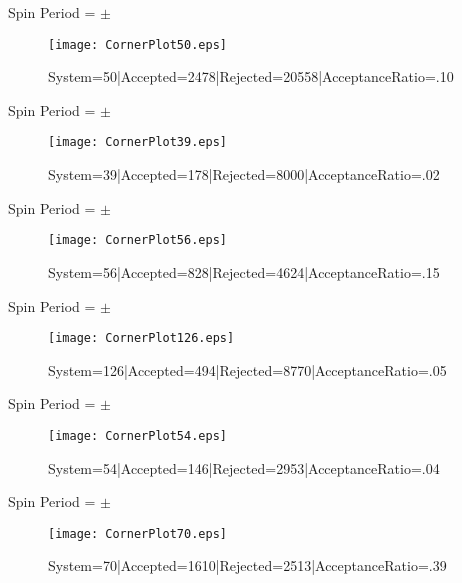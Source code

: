 \documentclass[10pt]{article}
\begin{document}
\begin{center}
        Spin Period = $\pm$ 
\begin{figure}[h] 
        \texttt{[image: CornerPlot50.eps]}
        \caption{System=50|Accepted=2478|Rejected=20558|AcceptanceRatio=.10}
        \label{S50}
        \centering
        \end{figure}
        \end{center}
\begin{center}
        Spin Period = $\pm$ 
\begin{figure}[h] 
        \texttt{[image: CornerPlot39.eps]}
        \caption{System=39|Accepted=178|Rejected=8000|AcceptanceRatio=.02}
        \label{S39}
        \centering
        \end{figure}
        \end{center}
\begin{center}
        Spin Period = $\pm$ 
\begin{figure}[h] 
        \texttt{[image: CornerPlot56.eps]}
        \caption{System=56|Accepted=828|Rejected=4624|AcceptanceRatio=.15}
        \label{S56}
        \centering
        \end{figure}
        \end{center}
\begin{center}
        Spin Period = $\pm$ 
\begin{figure}[h] 
        \texttt{[image: CornerPlot126.eps]}
        \caption{System=126|Accepted=494|Rejected=8770|AcceptanceRatio=.05}
        \label{S126}
        \centering
        \end{figure}
        \end{center}
\begin{center}
        Spin Period = $\pm$ 
\begin{figure}[h] 
        \texttt{[image: CornerPlot54.eps]}
        \caption{System=54|Accepted=146|Rejected=2953|AcceptanceRatio=.04}
        \label{S54}
        \centering
        \end{figure}
        \end{center}
\begin{center}
        Spin Period = $\pm$ 
\begin{figure}[h] 
        \texttt{[image: CornerPlot70.eps]}
        \caption{System=70|Accepted=1610|Rejected=2513|AcceptanceRatio=.39}
        \label{S70}
        \centering
        \end{figure}
        \end{center}
\end{document}
